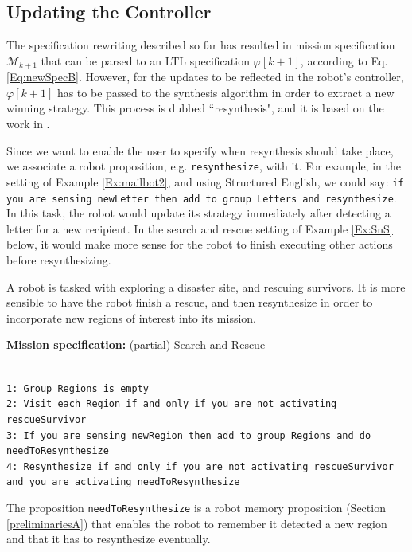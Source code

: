 \subsection{Updating the Controller}

The specification rewriting described so far has resulted in mission specification $\mathcal{M}_{k+1}$ that can be parsed to an LTL specification $\varphi [k+1]$, according to Eq. \eqref{Eq:newSpecB}. However, for the updates to be reflected in the robot's controller, $\varphi [k+1]$ has to be passed to the synthesis algorithm in order to extract a new winning strategy. This process is dubbed ``resynthesis", and it is based on the work in \cite{BingxinRSS2012}.

Since we want to enable the user to specify when resynthesis should take place,
we associate a robot proposition, e.g. \texttt{resynthesize}, with it. 
For example, in the setting of Example \ref{Ex:mailbot2}, and using Structured English, we could say:
\texttt{if you are sensing newLetter then add to group Letters and resynthesize}. 
In this task, the robot would update its strategy immediately after detecting a letter for a new recipient. In the search and rescue setting of Example \ref{Ex:SnS} below, it would make more sense for the robot to finish executing other actions before resynthesizing.

\begin{myExample}\label{Ex:SnS} A robot is tasked with exploring a disaster site, and rescuing survivors. It is more sensible to have the robot finish a rescue, and then resynthesize in order to incorporate new regions of interest into its mission.
	\begin{algorithm}
	\textbf{Mission specification:} (partial) Search and Rescue
	
	\vspace{-6 pt}
	\hrulefill\\
	{\small
	\texttt{1: Group Regions is empty}\\
	\texttt{2: Visit each Region if and only if you are not activating rescueSurvivor}\\
	\texttt{3: If you are sensing newRegion then add to group Regions and do needToResynthesize}\\	
	\texttt{4: Resynthesize if and only if you are not activating rescueSurvivor and you are activating needToResynthesize}\\
	}
	\vspace{-10 pt}
	\end{algorithm}
	
The proposition \texttt{needToResynthesize} is a robot memory proposition (Section \ref{preliminariesA}) that enables the robot to remember it detected a new region and that it has to resynthesize eventually.
\end{myExample}

